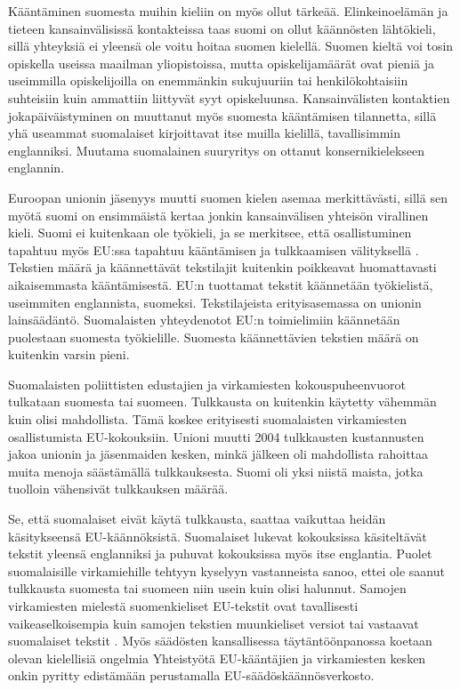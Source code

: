 \documentclass[]{../../metanetpaper}
\begin{document}
\begin{Parallel}[c]{70mm}{70mm}
{Kääntäminen suomesta muihin kieliin on myös ollut
tärkeää. Elinkeinoelämän ja tieteen kansainvälisissä kontakteissa taas
suomi on ollut käännösten lähtökieli, sillä yhteyksiä ei yleensä ole
voitu hoitaa suomen kielellä. Suomen kieltä voi tosin opiskella
useissa maailman yliopistoissa, mutta opiskelijamäärät ovat pieniä ja
useimmilla opiskelijoilla on enemmänkin sukujuuriin tai
henkilökohtaisiin suhteisiin kuin ammattiin liittyvät syyt
opiskeluunsa. Kansainvälisten kontaktien jokapäiväistyminen on
muuttanut myös suomesta kääntämisen tilannetta, sillä yhä useammat
suomalaiset kirjoittavat itse muilla kielillä, tavallisimmin
englanniksi. Muutama suomalainen suuryritys on ottanut
konsernikielekseen englannin.

Euroopan unionin jäsenyys muutti suomen kielen asemaa merkittävästi,
sillä sen myötä suomi on ensimmäistä kertaa jonkin kansainvälisen
yhteisön virallinen kieli. Suomi ei kuitenkaan ole työkieli, ja se
merkitsee, että osallistuminen tapahtuu myös EU:ssa tapahtuu
kääntämisen ja tulkkaamisen välityksellä \cite{Tulevaisuus2009}.
Tekstien määrä ja käännettävät tekstilajit kuitenkin poikkeavat
huomattavasti aikaisemmasta kääntämisestä. EU:n tuottamat tekstit
käännetään työkielistä, useimmiten englannista, suomeksi.
Tekstilajeista erityisasemassa on unionin lainsäädäntö. Suomalaisten
yhteydenotot EU:n toimielimiin käännetään puolestaan suomesta
työkielille. Suomesta käännettävien tekstien määrä on kuitenkin varsin
pieni.

Suomalaisten poliittisten edustajien ja virkamiesten
kokouspuheenvuorot tulkataan suomesta tai suomeen. Tulkkausta on
kuitenkin käytetty vähemmän kuin olisi mahdollista. Tämä koskee
erityisesti suomalaisten virkamiesten osallistumista
EU-kokouksiin. Unioni muutti 2004 tulkkausten kustannusten jakoa
unionin ja jäsenmaiden kesken, minkä jälkeen oli mahdollista rahoittaa
muita menoja säästämällä tulkkauksesta. Suomi oli yksi niistä maista,
jotka tuolloin vähensivät tulkkauksen määrää.

Se, että suomalaiset eivät käytä tulkkausta, saattaa vaikuttaa heidän
käsitykseensä EU-käännöksistä. Suomalaiset lukevat kokouksissa
käsiteltävät tekstit yleensä englanniksi ja puhuvat kokouksissa myös
itse englantia. Puolet suomalaisille virkamiehille tehtyyn kyselyyn
vastanneista sanoo, ettei ole saanut tulkkausta suomesta tai suomeen
niin usein kuin olisi halunnut. Samojen virkamiesten mielestä
suomenkieliset EU-tekstit ovat tavallisesti vaikeaselkoisempia kuin
samojen tekstien muunkieliset versiot tai vastaavat suomalaiset
tekstit \cite{Piehl2008}. Myös säädösten kansallisessa
täytäntöönpanossa koetaan olevan kielellisiä ongelmia
\cite{OECD2010} Yhteistyötä EU-kääntäjien ja virkamiesten kesken
onkin pyritty edistämään perustamalla EU-säädöskäännösverkosto.

}
\end{Parallel}
\end{document}
